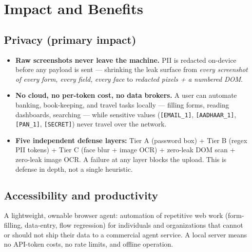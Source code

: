 \documentclass[11pt,a4paper]{article}
\newcommand{\code}[1]{\texttt{#1}}
\begin{document}
\section{Impact and Benefits}

\subsection{Privacy (primary impact)}
\begin{itemize}
  \item \textbf{Raw screenshots never leave the machine.} PII is redacted on-device before any payload is sent --- shrinking the leak surface from \emph{every screenshot of every form, every field, every face} to \emph{redacted pixels + a numbered DOM}.
  \item \textbf{No cloud, no per-token cost, no data brokers.} A user can automate banking, book-keeping, and travel tasks locally --- filling forms, reading dashboards, searching --- while sensitive values (\code{[EMAIL\_1]}, \code{[AADHAAR\_1]}, \code{[PAN\_1]}, \code{[SECRET]}) never travel over the network.
  \item \textbf{Five independent defense layers:} Tier A (password box) + Tier B (regex PII tokens) + Tier C (face blur + image OCR) + zero-leak DOM scan + zero-leak image OCR. A failure at any layer blocks the upload. This is defense in depth, not a single heuristic.
\end{itemize}

\subsection{Accessibility and productivity}
A lightweight, ownable browser agent: automation of repetitive web work (form-filling, data-entry, flow regression) for individuals and organizations that cannot or should not ship their data to a commercial agent service. A local server means no API-token costs, no rate limits, and offline operation.
\end{document}
